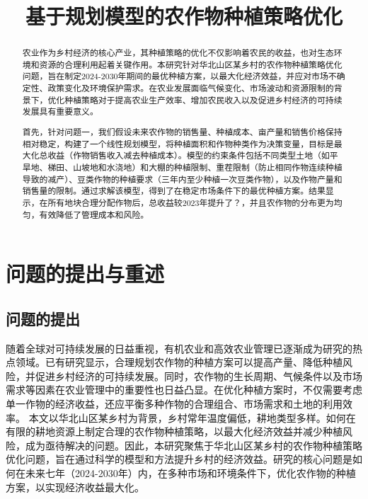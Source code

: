 \documentclass{cumcmthesis}
\title{基于规划模型的农作物种植策略优化}
\begin{document}
\maketitle

\begin{abstract}
农业作为乡村经济的核心产业，其种植策略的优化不仅影响着农民的收益，也对生态环境和资源的合理利用起着关键作用。本研究针对华北山区某乡村的农作物种植策略优化问题，旨在制定2024-2030年期间的最优种植方案，以最大化经济效益，并应对市场不确定性、政策变化及环境保护需求。在农业发展面临气候变化、市场波动和资源限制的背景下，优化种植策略对于提高农业生产效率、增加农民收入以及促进乡村经济的可持续发展具有重要意义。

首先，针对问题一，我们假设未来农作物的销售量、种植成本、亩产量和销售价格保持相对稳定，构建了一个线性规划模型，将种植面积和作物种类作为决策变量，目标是最大化总收益（作物销售收入减去种植成本）。模型的约束条件包括不同类型土地（如平旱地、梯田、山坡地和水浇地）和大棚的种植限制、重茬限制（防止相同作物连续种植导致的减产）、豆类作物的种植要求（三年内至少种植一次豆类作物），以及作物产量和销售量的限制。通过求解该模型，得到了在稳定市场条件下的最优种植方案。结果显示，在所有地块合理分配作物后，总收益较2023年提升了？，并且农作物的分布更为均匀，有效降低了管理成本和风险。

\end{abstract}

\section{问题的提出与重述}
\subsection{问题的提出}
随着全球对可持续发展的日益重视，有机农业和高效农业管理已逐渐成为研究的热点领域。已有研究显示，合理规划农作物的种植方案可以提高产量、降低种植风险，并促进乡村经济的可持续发展\cite{ref1}。同时，农作物的生长周期、气候条件以及市场需求等因素在农业管理中的重要性也日益凸显。在优化种植方案时，不仅需要考虑单一作物的经济收益，还应平衡多种作物的合理组合、市场需求和土地的利用效率。
本文以华北山区某乡村为背景，乡村常年温度偏低，耕地类型多样。如何在有限的耕地资源上制定合理的农作物种植策略，以最大化经济效益并减少种植风险，成为亟待解决的问题。因此，本研究聚焦于华北山区某乡村的农作物种植策略优化问题，旨在通过科学的模型和方法提升乡村的经济效益。研究的核心问题是如何在未来七年（2024-2030年）内，在多种市场和环境条件下，优化农作物的种植方案，以实现经济收益最大化。
\end{document}
